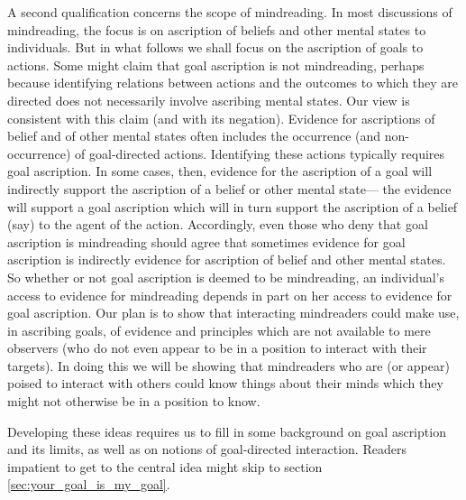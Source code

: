 \documentclass[12pt,a4paper]{extarticle}
\begin{document}
A second qualification concerns the scope of mindreading.
In most discussions of mindreading, the focus is on  ascription of beliefs and other mental states to individuals.
But in what follows we shall focus on the ascription of goals to actions.
Some might claim that goal ascription is not mindreading, perhaps because 
identifying relations between actions and the outcomes to which they are directed
does not necessarily involve ascribing mental states.
Our view is consistent with this claim (and with its negation).
\label{goal_ascription_verify}
Evidence for ascriptions of belief and of other mental states often includes the occurrence (and non-occurrence) of goal-directed actions.
Identifying these actions typically requires goal ascription.
In some cases, then, 
evidence for the ascription of a goal
will indirectly support the ascription of a belief or other mental state---%
the evidence will support  a goal ascription which will in turn support the ascription of a belief (say) to the agent of the action.
Accordingly, even those who deny that goal ascription is mindreading should agree that sometimes evidence for goal ascription is indirectly evidence for ascription of belief and other mental states.
So whether or not goal ascription is deemed to be mindreading,
an individual's access to evidence for mindreading  depends in part on her access to evidence for goal ascription.
Our plan is to show that interacting mindreaders could make use, in ascribing goals, of evidence and principles which are not available to mere observers (who do not even appear to be in a position to interact with their targets).
In doing this we will be showing that
mindreaders who are (or appear) poised to interact with others 
could know things about their minds 
which they might not otherwise be in a position to know.


Developing these ideas requires us to fill in some background on goal ascription and its limits, as well as on notions of goal-directed interaction.
Readers impatient to get to the central idea might skip to section \vref{sec:your_goal_is_my_goal}.
\end{document}
